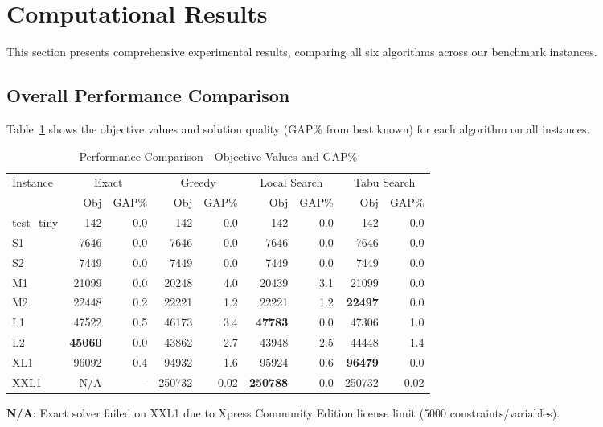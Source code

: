\documentclass[11pt,a4paper]{article}
\begin{document}
\newpage
\section{Computational Results}

This section presents comprehensive experimental results, comparing all six algorithms across our benchmark instances.

\subsection{Overall Performance Comparison}

Table~\ref{tab:performance} shows the objective values and solution quality (GAP\% from best known) for each algorithm on all instances.

\begin{table}[h]
\centering
\caption{Performance Comparison - Objective Values and GAP\%}
\label{tab:performance}
\small
\begin{tabular}{l|rr|rr|rr|rr}
\toprule
\multirow{2}{*}{Instance} & \multicolumn{2}{c|}{Exact} & \multicolumn{2}{c|}{Greedy} & \multicolumn{2}{c|}{Local Search} & \multicolumn{2}{c}{Tabu Search} \\
& Obj & GAP\% & Obj & GAP\% & Obj & GAP\% & Obj & GAP\% \\
\midrule
test\_tiny & 142 & 0.0 & 142 & 0.0 & 142 & 0.0 & 142 & 0.0 \\
S1 & 7646 & 0.0 & 7646 & 0.0 & 7646 & 0.0 & 7646 & 0.0 \\
S2 & 7449 & 0.0 & 7449 & 0.0 & 7449 & 0.0 & 7449 & 0.0 \\
M1 & 21099 & 0.0 & 20248 & 4.0 & 20439 & 3.1 & 21099 & 0.0 \\
M2 & 22448 & 0.2 & 22221 & 1.2 & 22221 & 1.2 & \textbf{22497} & 0.0 \\
L1 & 47522 & 0.5 & 46173 & 3.4 & \textbf{47783} & 0.0 & 47306 & 1.0 \\
L2 & \textbf{45060} & 0.0 & 43862 & 2.7 & 43948 & 2.5 & 44448 & 1.4 \\
XL1 & 96092 & 0.4 & 94932 & 1.6 & 95924 & 0.6 & \textbf{96479} & 0.0 \\
XXL1 & N/A & -- & 250732 & 0.02 & \textbf{250788} & 0.0 & 250732 & 0.02 \\
\bottomrule
\end{tabular}
\end{table}

\textbf{N/A}: Exact solver failed on XXL1 due to Xpress Community Edition license limit (5000 constraints/variables).
\end{document}
